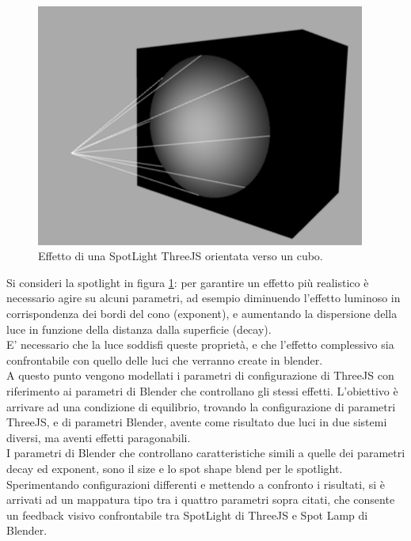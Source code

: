\\
\begin{figure}[htb]
 \centering
 \includegraphics[width=0.7\linewidth]{images/chapter_baking_service/ba_se_ex_cubo.png}\hfill
 \caption[SpotLight ThreeJS]{Effetto di una SpotLight ThreeJS orientata verso un cubo.}
 \label{fig:ba_se_ex_cubo}
\end{figure}
Si consideri la spotlight in figura \ref{fig:ba_se_ex_cubo}:
per garantire un effetto più realistico è necessario agire su alcuni parametri, ad esempio diminuendo l’effetto luminoso in corrispondenza dei bordi del cono (exponent), e aumentando la dispersione della luce in funzione della distanza dalla superficie (decay). 
\\
E’ necessario che la luce soddisfi queste proprietà, e che l’effetto complessivo sia confrontabile con quello delle luci che verranno create in blender.
\\ 
A questo punto vengono modellati i parametri di configurazione di ThreeJS con riferimento ai parametri di Blender che controllano gli stessi effetti. L’obiettivo è arrivare ad una condizione di equilibrio, trovando la configurazione di parametri ThreeJS, e di parametri Blender, avente come risultato due luci in due sistemi diversi, ma aventi effetti paragonabili.
\\
I parametri di Blender che controllano caratteristiche simili a quelle dei parametri decay ed exponent, sono il size e lo spot shape blend per le spotlight.
\\ 
Sperimentando configurazioni differenti e mettendo a confronto i risultati, si è arrivati ad un mappatura tipo tra i quattro parametri sopra citati, che consente un feedback visivo confrontabile tra SpotLight di ThreeJS e Spot Lamp di Blender.
\\
